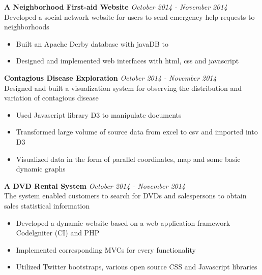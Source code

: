 \documentclass[3pt]{article}
\newenvironment{changemargin}[2]{%
  \begin{list}{}{%
    \setlength{\topsep}{0pt}%
    \setlength{\leftmargin}{#1}%
    \setlength{\rightmargin}{#2}%
    \setlength{\listparindent}{\parindent}%
    \setlength{\itemindent}{\parindent}%
    \setlength{\parsep}{\parskip}%
  }%
  \item[]}{\end{list}
}
\newenvironment{body} {
	\vspace*{-16pt}
	\begin{changemargin}{-0.25in}{-0.5in}
  }	
	{\end{changemargin}
}
\begin{document}
\begin{body}
	\vspace{18pt}

    \textbf{A Neighborhood First-aid Website}  \hfill \emph{October 2014 - November 2014}\\
    Developed a social network website for users to send emergency help requests to neighborhoods
    \begin{itemize} \itemsep -0pt
    \item {Built an Apache Derby database with javaDB to }
    \item {Designed and implemented web interfaces with html, css and javascript}
    \end{itemize}

    \textbf{Contagious Disease Exploration}  \hfill \emph{October 2014 - November 2014}\\
    Designed and built a visualization system for observing the distribution and variation of contagious disease
    \begin{itemize} \itemsep -0pt
    \item {Used Javascript library D3 to manipulate documents}
    \item {Transformed large volume of source data from excel to csv and imported into D3}
    \item {Visualized data in the form of parallel coordinates, map and some basic dynamic graphs}
    \end{itemize}

    \textbf{A DVD Rental System}  \hfill \emph{October 2014 - November 2014}\\
    The system enabled customers to search for DVDs and salespersons to obtain sales statistical information
    \begin{itemize} \itemsep -0pt
    \item {Developed a dynamic website based on a web application framework Codelgniter (CI) and PHP}
    \item {Implemented corresponding MVCs for every functionality}
    \item {Utilized Twitter bootstraps, various open source CSS and Javascript libraries}
    \end{itemize}

\end{body}
\end{document}
